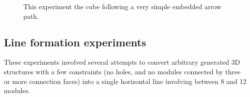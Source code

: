 \begin{figure}[h]
	\caption{This experiment the cube following a very simple embedded arrow path.}
	
	\label{fig:arrowExperiment}
\end{figure}

\subsection{Line formation experiments}
\label{sec:mblocksExperimentsLine}

These experiments involved several attempts to convert arbitrary generated 3D structures with a few constraints (no holes, and no modules connected by three or more connection faces) into a single horizontal line involving between 8 and 12 modules.

